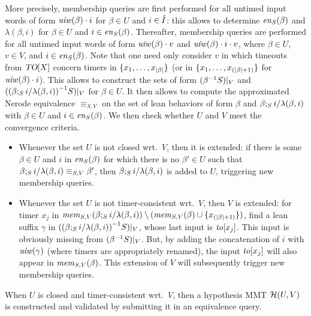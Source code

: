  More precisely,
membership queries are first performed
  for all untimed input words of form $\untimedinputword(\beta) \cdot i$
   for $\beta \in U$ and $i \in \extinputs$: this allows to determine
   $\feasibleinputs{\beta}{S}$ and $\lambda(\beta,i)$
   for $\beta \in U$ and $i \in \feasibleinputs{\beta}{S}$.
   Thereafter, membership queries are performed
  for all untimed input words of form $\untimedinputword(\beta) \cdot v$ and
  $\untimedinputword(\beta) \cdot i \cdot v$, where
  $\beta \in U$, $v \in V$, and
  $i \in \feasibleinputs{\beta}{S}$. Note that one need only consider
  $v$ in which timeouts from $\toevents$ concern timers in
  $\set{x_1, \ldots, x_{|\beta|}}$ (or in  $\set{x_1, \ldots, x_{(|\beta|+1)}}$
  for $\untimedinputword(\beta) \cdot i$).
  This allows to construct the sets of form $\apprsuffixbehs{S}{\beta}{V}$ and
  $\apprsuffixbehs{S}{(\extend{\beta}{i}{\lambda(\beta,i)})}{V}$
  for $\beta \in U$.
  It then allows to compute the approximated Nerode equivalence $\equiv_{S,V}$ on
  the set of lean behaviors of form $\beta$ and
  $\extend{\beta}{i}{\lambda(\beta,i)}$ with
  $\beta \in U$ and $i \in \feasibleinputs{\beta}{S}$.
  We then check whether $U$ and $V$ meet the convergence criteria.
  \begin{itemize}
    \item
  Whenever the set $U$ is not closed wrt.\ $V$, then it is extended:
if there is some $\beta \in U$ and $i$ in $\feasibleinputs{\beta}{S}$
for which there is no $\beta' \in U$ such that
$\extend{\beta}{i}{\lambda(\beta,i)} \equiv_{S,V} \beta'$, 
then $\extend{\beta}{i}{\lambda(\beta,i)}$ is added to $U$,
triggering new membership queries.
\item
  Whenever the set $U$ is not timer-consistent wrt.\ $V$, then $V$ is extended:
for timer $x_j$ in
$\apprgetmemorable{S}{\extend{\beta}{i}{\lambda(\beta,i)}}{V} \setminus (\apprgetmemorable{S}{\beta}{V} \cup \set{x_{(|\beta|+1)}})$, find a lean
suffix $\gamma$ in
$\apprsuffixbehs{S}{(\extend{\beta}{i}{\lambda(\beta,i)})}{V}$, whose last input
is $\toevent{x_j}$. This input is
obviously missing from $\apprsuffixbehs{S}{\beta}{V}$. But, by adding
the concatenation of $i$ with $\untimedinputword(\gamma)$ (where
timers are  appropriately renamed), the input $\toevent{x_j}$
will also appear in $\apprgetmemorable{S}{\beta}{V}$.
This extension of $V$ will subsequently trigger new membership queries.
\end{itemize}
When $U$ is closed and timer-consistent wrt.\ $V$, then
a hypothesis MMT $\hypoof UV$ is constructed and
validated by submitting it in an equivalence query.
